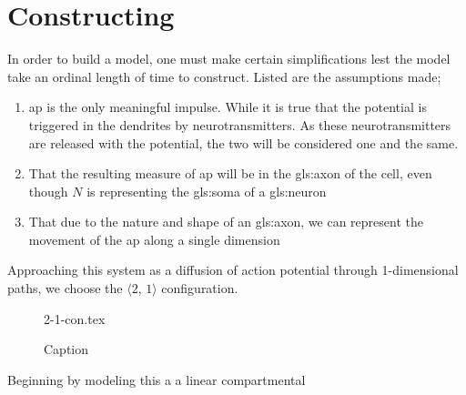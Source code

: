 \documentclass[class={myRUCProject}, crop=false]{standalone}
\begin{document}







\section{Constructing}

In order to build a model, one must make certain simplifications lest the model take an ordinal length of time to construct. Listed are the assumptions made;
\begin{enumerate}
    \item \gls{ap} is the only meaningful impulse. While it is true that the potential is triggered in the dendrites by neurotransmitters. As these neurotransmitters are released with the potential, the two will be considered one and the same.
    \item That the resulting measure of \gls{ap} will be in the \gls{gls:axon} of the cell, even though \(N\) is representing the \gls{gls:soma} of a \gls{gls:neuron}
    \item That due to the nature and shape of an \gls{gls:axon}, we can represent the movement of the \gls{ap} along a single dimension
\end{enumerate}

Approaching this system as a diffusion of action potential through 1-dimensional paths, we choose the \(\langle 2,\,1 \rangle\) configuration.
\begin{figure}[H]
    \centering
    {2-1-con.tex}
    \caption{Caption}\label{fig:2-1-con}
\end{figure}
Beginning by modeling this a a linear compartmental
\end{document}

